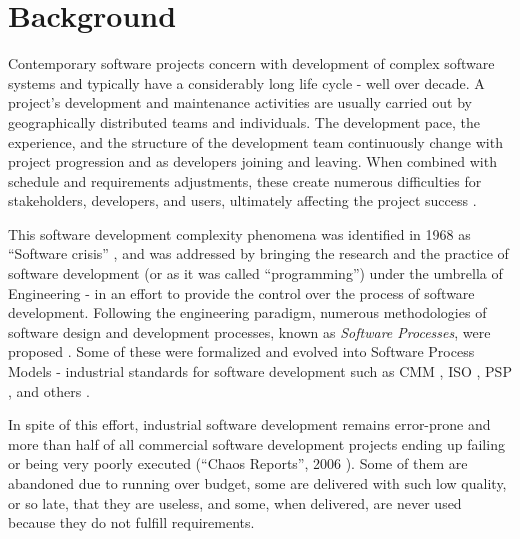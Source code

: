 \newpage
%
%
\section{Background}\label{sec_background}
Contemporary software projects concern with development of complex software systems and typically have 
a considerably long life cycle - well over decade.
A project's development and maintenance activities are usually carried out by geographically 
distributed teams and individuals. The development pace, the experience, and the structure of the 
development team continuously change with project progression and as developers joining and leaving. 
When combined with schedule and requirements adjustments, these create numerous difficulties 
for stakeholders, developers, and users, ultimately affecting the project success \cite{citeulike:2207657}. 

This software development complexity phenomena was identified in 1968 as ``Software crisis'' 
\cite{naur_crisis_68}, and was addressed by bringing the research and the practice of software development 
(or as it was called ``programming'') under the umbrella of Engineering - in an effort to provide 
the control over the process of software development. 
Following the engineering paradigm, numerous methodologies of software design and development 
processes, known as \textit{Software Processes}, were proposed \cite{citeulike:10002165}.
Some of these were formalized and evolved into Software Process Models - industrial standards for 
software development such as CMM \cite{citeulike:9962021}, ISO \cite{iso-standard}, 
PSP \cite{citeulike:8347315}, and others \cite{citeulike:5043104}. 

In spite of this effort, industrial software  development remains error-prone and more than half of all 
commercial software development projects ending up failing or being very poorly executed 
(``Chaos Reports'', 2006 \cite{chaos2006}). Some of them are abandoned due to running 
over budget, some are delivered with such low quality, or so late, that they are useless, and some, 
when delivered, are never used because they do not fulfill requirements. 

